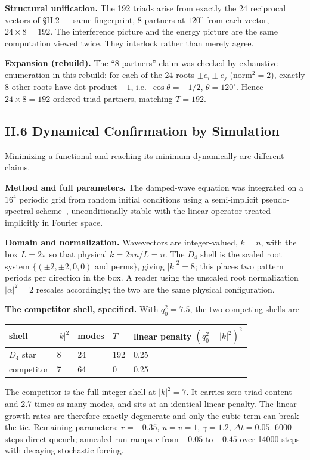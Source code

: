\documentclass[11pt,a4paper]{article}
\newcommand{\expansion}[1]{\par\smallskip\noindent\textbf{Expansion (rebuild).} #1\par\smallskip}
\begin{document}
\textbf{Structural unification.} The 192 triads arise from exactly the 24 reciprocal vectors of \S II.2 --- same fingerprint, 8 partners at $120^\circ$ from each vector, $24 \times 8 = 192$. The interference picture and the energy picture are the same computation viewed twice. They interlock rather than merely agree.
\expansion{The ``8 partners'' claim was checked by exhaustive enumeration in this rebuild: for each of the 24 roots $\pm e_i \pm e_j$ (norm$^2 = 2$), exactly 8 other roots have dot product $-1$, i.e.\ $\cos\theta = -1/2$, $\theta = 120^\circ$. Hence $24 \times 8 = 192$ ordered triad partners, matching $T = 192$.}

\subsection{II.6 Dynamical Confirmation by Simulation}
Minimizing a functional and reaching its minimum dynamically are different claims.

\textbf{Method and full parameters.} The damped-wave equation was integrated on a $16^4$ periodic grid from random initial conditions using a semi-implicit pseudo-spectral scheme~\cite{trefethen2000}, unconditionally stable with the linear operator treated implicitly in Fourier space.

\textbf{Domain and normalization.} Wavevectors are integer-valued, $k = n$, with the box $L = 2\pi$ so that physical $k = 2\pi n/L = n$. The $D_4$ shell is the scaled root system $\{(\pm2,\pm2,0,0)$ and perms$\}$, giving $|k|^2 = 8$; this places two pattern periods per direction in the box. A reader using the unscaled root normalization $|\alpha|^2 = 2$ rescales accordingly; the two are the same physical configuration.

\textbf{The competitor shell, specified.} With $q_0^2 = 7.5$, the two competing shells are
\begin{center}
\begin{tabular}{lllll}
\toprule
shell & $|k|^2$ & modes & $T$ & linear penalty $(q_0^2 - |k|^2)^2$ \\
\midrule
$D_4$ star & 8 & 24 & 192 & 0.25 \\
competitor & 7 & 64 & 0 & 0.25 \\
\bottomrule
\end{tabular}
\end{center}
The competitor is the full integer shell at $|k|^2 = 7$. It carries zero triad content and 2.7 times as many modes, and sits at an identical linear penalty. The linear growth rates are therefore exactly degenerate and only the cubic term can break the tie. Remaining parameters: $r = -0.35$, $u = v = 1$, $\gamma = 1.2$, $\Delta t = 0.05$. 6000 steps direct quench; annealed run ramps $r$ from $-0.05$ to $-0.45$ over 14000 steps with decaying stochastic forcing.
\end{document}
